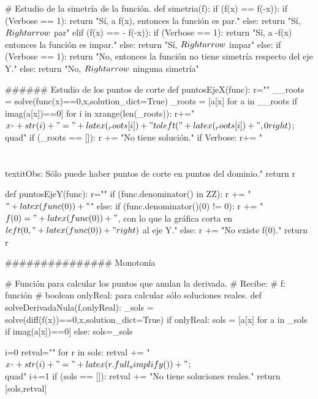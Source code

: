 \begin{sagesilent}
# Estudio de la simetría de la función.
def simetria(f):
    if (f(x) == f(-x)):
        if (Verbose == 1):
            return "Sí, a f(x), entonces la función es par."
        else:
            return "Sí, $\\Rightarrow$ par"
    elif (f(x) == - f(-x)):
        if (Verbose == 1):
            return "Sí, a -f(x) entonces la función es impar."
        else:
            return "Sí, $\\Rightarrow$ impar"
    else:
        if (Verbose == 1):
            return "No, entonces la función no tiene simetría respecto del eje Y."
        else:
            return "No, $\\Rightarrow$ ninguna simetría"

###### Estudio de los puntos de corte
def puntosEjeX(func):
    r=""
    __roots = solve(func(x)==0,x,solution_dict=True)
    _roots = [a[x] for a in __roots if imag(a[x])==0]
    for i in xrange(len(_roots)):
        r+="$x_"+str(i)+" = "+latex(_roots[i])+"\\to \\left("+latex(_roots[i])+",0\\right)$;\\quad"
    if (_roots == []):
        r += "No tiene solución."
    if Verbose:
        r+= "\\\\\\textit{Obs: Sólo puede haber puntos de corte en puntos del dominio.}"
    return r

def puntosEjeY(func):
    r=""
    if (func.denominator() in ZZ):
        r += "$" + latex(func(0)) +"$"
    else:
        if (func.denominator()(0) != 0):
            r += "$f(0) = " + latex(func(0)) + "$, con lo que la gráfica corta en $\\left(0,"+latex(func(0)) + "\\right)$ al eje Y."   
        else:
            r +=  "No existe f(0)."    
    return r


############### Monotonía


# Función para calcular los puntos que anulan la derivada.
# Recibe:
# f: función
# boolean onlyReal: para calcular sólo soluciones reales.
def solveDerivadaNula(f,onlyReal):
    _sols = solve(diff(f(x))==0,x,solution_dict=True)
    if onlyReal:
        sols = [a[x] for a in _sols if imag(a[x])==0]
    else: 
        sols=_sols

    i=0
    retval=""
    for r in sols:
        retval += "$x_"+str(i)+" = "+latex(r.full_simplify())+"$;\\quad"
        i+=1
    if (sols == []):
        retval += "No tiene soluciones reales."
    return [sols,retval]



\end{sagesilent}
